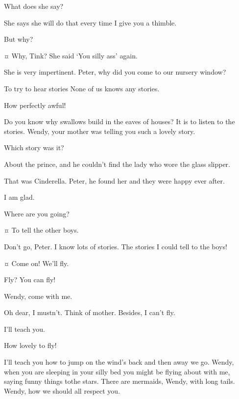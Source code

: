 \begin{drama}
\wendyspeaks
What does she say?

\peterspeaks
She says she will do that every time I give you a thimble.

\wendyspeaks
But why?

\peterspeaks {}¤
Why, Tink?
She said ‘You silly ass’ again.

\wendyspeaks
She is very impertinent.
Peter, why did you come to our nursery window?

\peterspeaks
To try to hear stories None of us knows any stories.

\wendyspeaks
How perfectly awful!

\peterspeaks
Do you know why swallows build in the eaves of houses?
It is to listen to the stories.
Wendy, your mother was telling you such a lovely story.

\wendyspeaks
Which story was it?

\peterspeaks
About the prince, and he couldn’t find the lady who wore the glass slipper.

\wendyspeaks
That was Cinderella.
Peter, he found her and they were happy ever after.

\peterspeaks
I am glad.

\wendyspeaks
Where are you going?

\peterspeaks {}¤
To tell the other boys.

\wendyspeaks
Don’t go, Peter.
I know lots of stories.
The stories I could tell to the boys!

\peterspeaks {}¤
Come on!
We’ll fly.

\wendyspeaks
Fly?
You can fly!


\peterspeaks
Wendy, come with me.

\wendyspeaks
Oh dear, I mustn’t.
Think of mother.
Besides, I can’t fly.

\peterspeaks
I’ll teach you.

\wendyspeaks
How lovely to fly!

\peterspeaks
I’ll teach you how to jump on the wind’s back and then away we go.
Wendy, when you are sleeping in your silly bed you might be flying about with me, saying funny things tothe stars.
There are mermaids, Wendy, with long tails.
Wendy, how we should all respect you.


\end{drama}
